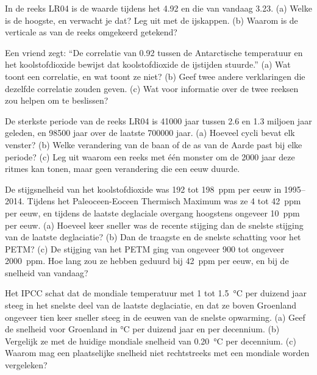 \begin{exercise}[$\star\star$]\label{exo:g12:past-climates:10}
In de reeks LR04 is de waarde tijdens het 
\qty{4.92}{\permil} en die van vandaag \qty{3.23}{\permil}. (a) Welke is de hoogste,
en verwacht je dat? Leg uit met de ijskappen. (b) Waarom is de
verticale as van de reeks omgekeerd getekend?
\end{exercise}

\begin{exercise}[$\star\star$]\label{exo:g12:past-climates:11}
Een vriend zegt: ``De correlatie van 0.92 tussen de Antarctische temperatuur
en het koolstofdioxide bewijst dat koolstofdioxide de ijstijden stuurde.''
(a) Wat toont een correlatie, en wat toont ze niet? (b) Geef twee
andere verklaringen die dezelfde correlatie zouden geven. (c) Wat voor
informatie over de twee reeksen zou helpen om te beslissen?
\end{exercise}

\begin{exercise}[$\star\star\star$]\label{exo:g12:past-climates:12}
De sterkste periode van de reeks LR04 is \num{41000} jaar tussen 2.6
en 1.3 miljoen jaar geleden, en \num{98500} jaar over de laatste \num{700000}
jaar. (a) Hoeveel cycli bevat elk venster? (b) Welke verandering van de
baan of de as van de Aarde past bij elke periode? (c) Leg uit waarom een reeks met
één monster om de \num{2000} jaar deze ritmes kan tonen, maar geen verandering
die een eeuw duurde.
\end{exercise}

\begin{exercise}[$\star\star\star$]\label{exo:g12:past-climates:13}
De stijgsnelheid van het koolstofdioxide was 192 tot \qty{198}{ppm} per eeuw in
1995--2014. Tijdens het Paleoceen-Eoceen Thermisch Maximum was ze 4 tot
\qty{42}{ppm} per eeuw, en tijdens de laatste deglaciale overgang hoogstens
ongeveer \qty{10}{ppm} per eeuw. (a) Hoeveel keer sneller was de recente stijging
dan de snelste stijging van de laatste deglaciatie? (b) Dan de traagste en de
snelste schatting voor het PETM? (c) De stijging van het PETM ging van ongeveer 900 tot ongeveer
\qty{2000}{ppm}. Hoe lang zou ze hebben geduurd bij \qty{42}{ppm} per eeuw,
en bij de snelheid van vandaag?
\end{exercise}

\begin{exercise}[$\star\star\star$]\label{exo:g12:past-climates:14}
Het IPCC schat dat de mondiale temperatuur met 1 tot
\qty{1.5}{\degreeCelsius} per duizend jaar steeg in het snelste deel van de laatste
deglaciatie, en dat ze boven Groenland ongeveer tien keer sneller steeg in de
eeuwen van de snelste opwarming. (a) Geef de snelheid voor Groenland in
\unit{\degreeCelsius} per duizend jaar en per decennium. (b) Vergelijk ze met de
huidige mondiale snelheid van \qty{0.20}{\degreeCelsius} per decennium. (c) Waarom mag een
plaatselijke snelheid niet rechtstreeks met een mondiale worden vergeleken?
\end{exercise}

